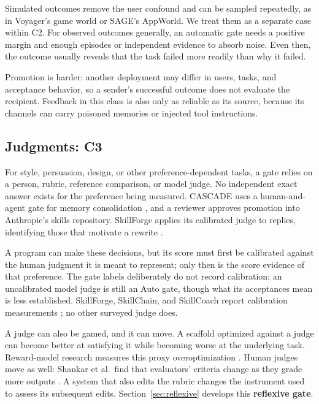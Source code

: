 \documentclass[
  11pt,
]{article}
\begin{document}
Simulated outcomes remove the user confound and can be sampled repeatedly, as in Voyager's game world or SAGE's AppWorld. We treat them as a separate case within C2. For observed outcomes generally, an automatic gate needs a positive margin and enough episodes or independent evidence to absorb noise. Even then, the outcome usually reveals that the task failed more readily than why it failed.

Promotion is harder: another deployment may differ in users, tasks, and acceptance behavior, so a sender's successful outcome does not evaluate the recipient. Feedback in this class is also only as reliable as its source, because its channels can carry poisoned memories or injected tool instructions.

\subsection{Judgments: C3}\label{judgments-c3}

For style, persuasion, design, or other preference-dependent tasks, a gate relies on a person, rubric, reference comparison, or model judge. No independent exact answer exists for the preference being measured. CASCADE uses a human-and-agent gate for memory consolidation \cite{huang2025cascade}, and a reviewer approves promotion into Anthropic's skills repository. SkillForge applies its calibrated judge to replies, identifying those that motivate a rewrite \cite{skillforge2026}.

A program can make these decisions, but its score must first be calibrated against the human judgment it is meant to represent; only then is the score evidence of that preference. The gate labels deliberately do not record calibration: an uncalibrated model judge is still an Auto gate, though what its acceptances mean is less established. SkillForge, SkillChain, and SkillCoach report calibration measurements \cite{skillforge2026, hu2026skillchain, zhu2026skillcoach}; no other surveyed judge does.

A judge can also be gamed, and it can move. A scaffold optimized against a judge can become better at satisfying it while becoming worse at the underlying task. Reward-model research measures this proxy overoptimization \cite{gao2023overoptimization}. Human judges move as well: Shankar et al.~find that evaluators' criteria change as they grade more outputs \cite{shankar2024validators}. A system that also edits the rubric changes the instrument used to assess its subsequent edits. Section~\ref{sec:reflexive} develops this \textbf{reflexive gate}.
\end{document}
